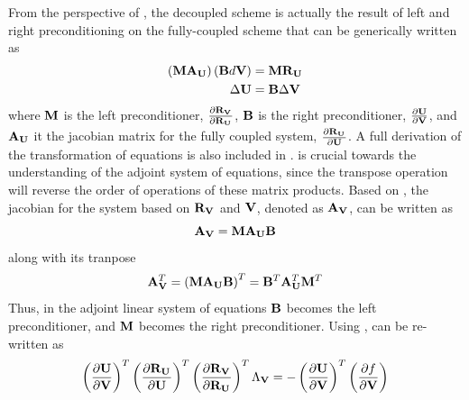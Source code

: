 From the perspective of , the decoupled scheme is actually
the result of left and right preconditioning on the fully-coupled scheme that
can be generically written as
\begin{equation}
  \begin{aligned}
    \left(\mathbf M \mathbf A_{\mathbf U} \right) \left( \mathbf B d\mathbf V \right) &= \mathbf M \mathbf R_{{\mathbf U}_{}} \\
    \Delta \mathbf U &= \mathbf B \Delta \mathbf V
  \end{aligned}
  \label{generic-fc-to-dc}
\end{equation}
where $\mathbf M$ is the left preconditioner, $\frac{\partial \mathbf R_{{\mathbf V}_{}}}{\partial \mathbf R_{{\mathbf U}_{}}}$, $\mathbf B$ is the right
preconditioner, $\frac{\partial \mathbf U}{\partial \mathbf V}$, and $\mathbf A_{\mathbf U}$ it the jacobian matrix for the
fully coupled system, $\frac{\partial \mathbf R_{{\mathbf U}_{}}}{\partial \mathbf U}$.  A full derivation of the
transformation of equations is also included in .
 is crucial towards the understanding of the adjoint
system of equations, since the transpose operation will reverse the order of
operations of these matrix products.  Based on , the
jacobian for the system based on $\mathbf R_{{\mathbf V}_{}}$ and $\mathbf V$, denoted as $\mathbf A_{\mathbf V}$, can
be written as
\begin{equation}
  \mathbf A_{\mathbf V} = \mathbf M \mathbf A_{\mathbf U} \mathbf B
  \label{adj-dc-generic}
\end{equation}
along with its tranpose
\begin{equation}
  \mathbf A_{\mathbf V}^{T}
   = \left( \mathbf M \mathbf A_{\mathbf U} \mathbf B \right)^{T}
   = \mathbf B^{T} \mathbf A_{\mathbf U}^{T} \mathbf M^{T}
  \label{adj-dc-generic-transpose}
\end{equation}
Thus, in the adjoint linear system of equations $\mathbf B$ becomes the left
preconditioner, and $\mathbf M$ becomes the right preconditioner.  Using
,  can be re-written as
\begin{equation}
  \left( \frac{\partial \mathbf U}{\partial \mathbf V} \right)^{T}
  \left(\frac{\partial \mathbf R_{{\mathbf U}_{}}}{\partial \mathbf U} \right)^{T} 
  \left( \frac{\partial \mathbf R_{{\mathbf V}_{}}}{\partial \mathbf R_{{\mathbf U}_{}}} \right)^{T}
  \Lambda_{\mathbf V} 
  = 
  - \left( \frac{\partial \mathbf U}{\partial \mathbf V} \right)^{T}
  \left( \frac{\partial f}{\partial \mathbf V} \right)
  \label{adj-u-to-v}
\end{equation}
